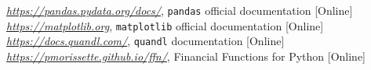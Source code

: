 \begin{thebibliography}{9}
 \href{https://pandas.pydata.org/docs/}{\emph{https://pandas.pydata.org/docs/}}, \texttt{pandas} official documentation [Online]
 \href{https://matplotlib.org}{\emph{https://matplotlib.org}}, \texttt{matplotlib} official documentation [Online]
 \href{https://docs.quandl.com/}{\emph{https://docs.quandl.com/}}, \texttt{quandl} documentation [Online]
 \href{https://pmorissette.github.io/ffn/}{\emph{https://pmorissette.github.io/ffn/}}, Financial Functions for Python [Online]
\end{thebibliography}
